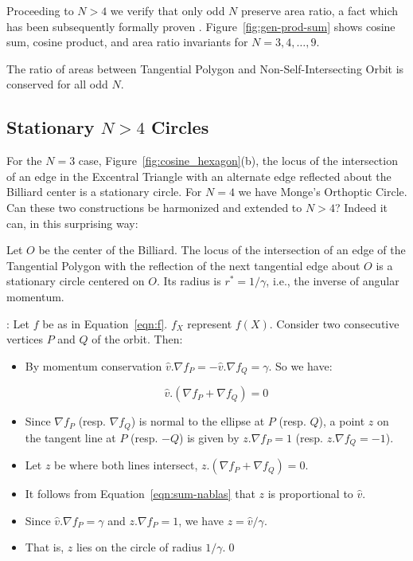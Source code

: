 Proceeding to $N>4$ we verify that only odd $N$ preserve area ratio, a fact which has been subsequently formally proven \cite{sergei19_private_meromorphic}. 
Figure~\ref{fig:gen-prod-sum} shows cosine sum, cosine product, and area ratio invariants for $N=3,4,\ldots,9$.

\begin{theorem}
The ratio of areas between Tangential Polygon and Non-Self-Intersecting Orbit is conserved for all odd $N$.
\end{theorem}

\subsection{Stationary $N>4$ Circles}

For the $N=3$ case,  Figure~\ref{fig:cosine_hexagon}(b), the locus of the intersection of an edge in the Excentral Triangle with an alternate edge reflected about the Billiard center is a stationary circle. For $N=4$ we have Monge's Orthoptic Circle. Can these two constructions be harmonized and extended to $N>4$? Indeed it can, in this surprising way:

\begin{theorem}
Let $O$ be the center of the Billiard. The locus of the intersection of an edge of the Tangential Polygon with the reflection of the next tangential edge about $O$ is a stationary circle centered on $O$. Its radius is $r^*=1/\gamma$, i.e., the inverse of angular momentum.
\end{theorem}

 \cite{sergei19_private_circles}: Let $f$ be as in Equation~\ref{eqn:f}. $f_X$ represent $f(X)$. Consider two consecutive vertices $P$ and $Q$ of the orbit. Then:

\begin{itemize}
\item By momentum conservation $\hat{v}.\nabla f_P= -\hat{v}.\nabla f_Q=\gamma$. So we have:

\begin{equation}
    \hat{v}.\left(\nabla{f_P} + \nabla{f_Q}\right)=0
    \label{eqn:sum-nablas}
\end{equation}

\item Since $\nabla{f_P}$ (resp. $\nabla{f_Q}$) is normal to the ellipse at $P$ (resp.  $Q$), a point $z$ on the tangent line at $P$ (resp. $-Q$) is given by $z.\nabla{f_P}=1$ (resp. $z.\nabla{f_Q}=-1$).
\item Let $z$ be where both lines intersect, $z.\left(\nabla{f_P}+{\nabla} f_Q\right)=0$.

\item It follows from Equation~\ref{eqn:sum-nablas} that $z$ is proportional to $\hat{v}$.

\item Since $\hat{v}.\nabla{f_P}=\gamma$ and $z.\nabla{f_P}=1$, we have $z = \hat{v}/\gamma$.
\item That is, $z$ lies on the circle of radius $1/\gamma$.\qed
\end{itemize}

